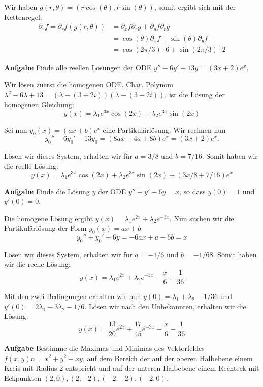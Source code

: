 Wir haben $g(r, \theta) = (r \cos(\theta), r \sin(\theta))$, somit ergibt sich mit der Kettenregel:
\begin{align*}
    \partial_r f = \partial_r f(g(r, \theta)) &= \partial_x f \partial_r g + \partial_y f \partial_r g \\
    &= \cos(\theta) \partial_x f + \sin(\theta) \partial_y f \\
    &= \cos(2 \pi / 3) \cdot 6 + \sin(2 \pi / 3)  \cdot 2
\end{align*}

\hrulefill

\textbf{Aufgabe} Finde alle reellen Lösungen der ODE $y'' - 6y' + 13y = (3x + 2) e^x$. \smallskip

Wir lösen zuerst die homogenen ODE. Char. Polynom $\lambda^2 - 6 \lambda + 13 = 
(\lambda - (3 + 2i))(\lambda - (3 - 2i))$, ist die Lösung der homogenen Gleichung:
$$y(x) = \lambda_1 e^{3x} \cos(2x) + \lambda_2 e^{3x} \sin(2x)$$

Sei nun $y_0(x) = (ax + b) e^x$ eine Partikulärlösung. Wir rechnen nun
$$y_0'' - 6y_0' + 13y_0 = (8ax - 4 a + 8b)e^x = (3x + 2)e^x .$$

Lösen wir dieses System, erhalten wir für $a = 3/8$ und $b = 7 /16$. Somit haben wir die reelle Lösung:
$$y(x) = \lambda_1 e^{3x} \cos(2x) + \lambda_2 e^{3x} \sin(2x) + (3x/8 + 7/16)e^x$$

\hrulefill

\textbf{Aufgabe} Finde die Lösung $y$ der ODE $y'' + y' -6y = x$, so dass $y(0) = 1$ und 
$y'(0) = 0$. \smallskip

Die homogene Lösung ergibt $y(x) = \lambda_1 e^{2x} + \lambda_2 e^{-3x}$. Nun suchen wir die Partikulärlösung
der Form $y_0(x) = ax + b$.
$$y_0'' + y_0' - 6y = -6ax + a - 6b = x$$

Lösen wir dieses System, erhalten wir für $a = -1/6$ und $b = -1/68$. Somit haben wir die reelle Lösung:
$$y(x) = \lambda_1 e^{2x} + \lambda_2 e^{-3x} - \frac{x}{6} - \frac{1}{36}$$

Mit den zwei Bedingungen erhalten wir nun $y(0) = \lambda_1 + \lambda_2 - 1/36$ und 
$y'(0) = 2 \lambda_1 - 3 \lambda_2 - 1/6$. Lösen wir nach den Unbekannten, erhalten wir die Lösung:
$$y(x) = \frac{13}{20} e^{2x} + \frac{17}{45} e^{-3x} - \frac{x}{6} - \frac{1}{36}$$

\hrulefill

\textbf{Aufgabe} Bestimme die Maximas und Minimas des Vektorfeldes 
$f(x,y)n = x^2 + y^2 - xy$, auf dem Bereich der auf der oberen Halbebene
einem Kreis mit Radius $2$ entspricht und auf der unteren Halbebene einem
Rechteck mit Eckpunkten $(2,0), (2, -2), (-2, -2), (-2, 0)$. \smallskip

